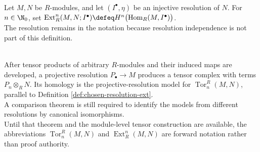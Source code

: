 \begin{definition} \label{def:chosen-resolution-ext} \\
Let $M,N$ be $R$-modules, and let $(I^\bullet,\eta)$ be an injective resolution of $N$. For $n\in\N_0$, set $\operatorname{Ext}_R^n(M,N;I^\bullet)\defeq H^n\bigl(\operatorname{Hom}_R(M,I^\bullet)\bigr)$.\\
The resolution remains in the notation because resolution independence is not part of this definition.
\end{definition}

\begin{perspective} \label{persp:tor-ext-resolution-models} \\
After tensor products of arbitrary $R$-modules and their induced maps are developed, a projective resolution $P_\bullet\to M$ produces a tensor complex with terms $P_n\otimes_RN$. Its homology is the projective-resolution model for $\operatorname{Tor}_n^R(M,N)$, parallel to Definition \ref{def:chosen-resolution-ext}.\\
A comparison theorem is still required to identify the models from different resolutions by canonical isomorphisms.\\
Until that theorem and the module-level tensor construction are available, the abbreviations $\operatorname{Tor}_n^R(M,N)$ and $\operatorname{Ext}_R^n(M,N)$ are forward notation rather than proof authority.
\end{perspective}
